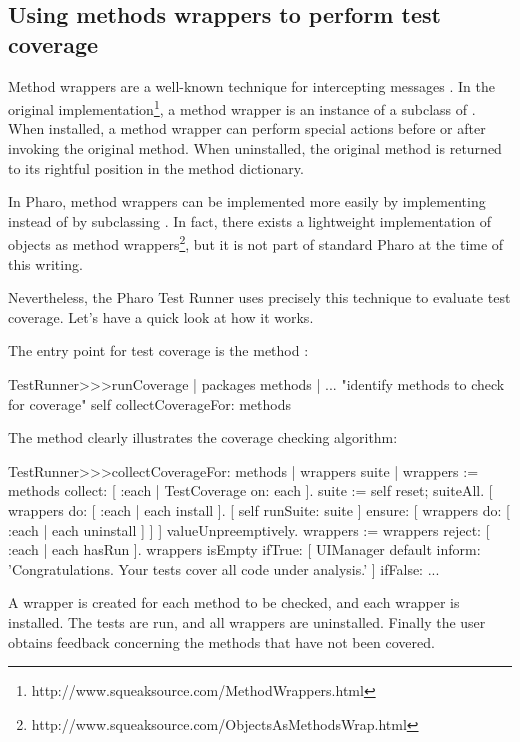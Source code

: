 \documentclass[a4paper,10pt,twoside]{book}
\begin{document}
\subsection{Using methods wrappers to perform test coverage}

Method wrappers are a well-known technique for intercepting messages \cite{Bran98a}.
In the original implementation\footnote{http://www.squeaksource.com/MethodWrappers.html}, a method wrapper is an instance of a subclass of . When installed, a method wrapper can perform special actions before or after invoking the original method.
When uninstalled, the original method is returned to its rightful position in the method dictionary.

In Pharo, method wrappers can be implemented more easily by implementing  instead of by subclassing . In fact, there exists a lightweight implementation of objects as method wrappers\footnote{http://www.squeaksource.com/ObjectsAsMethodsWrap.html}, but it is not part of standard Pharo at the time of this writing.

Nevertheless, the Pharo Test Runner uses precisely this technique to evaluate test coverage.
Let's have a quick look at how it works.

The entry point for test coverage is the method :
\begin{code}{}
TestRunner>>>runCoverage
	| packages methods |
	... "identify methods to check for coverage"
	self collectCoverageFor: methods
\end{code}

The method  clearly illustrates the coverage checking algorithm:
\begin{code}{}
TestRunner>>>collectCoverageFor: methods
	| wrappers suite |
	wrappers := methods collect: [ :each | TestCoverage on: each ].
	suite := self
		reset;
		suiteAll.
	[ wrappers do: [ :each | each install ].
	  [ self runSuite: suite ] ensure: [ wrappers do: [ :each | each uninstall ] ] ] valueUnpreemptively.
	wrappers := wrappers reject: [ :each | each hasRun ].
	wrappers isEmpty 
		ifTrue: 
			[ UIManager default inform: 'Congratulations. Your tests cover all code under analysis.' ]
		ifFalse: ...
\end{code}
A wrapper is created for each method to be checked, and each wrapper is installed.
The tests are run, and all wrappers are uninstalled.
Finally the user obtains feedback concerning the methods that have not been covered.
\end{document}
